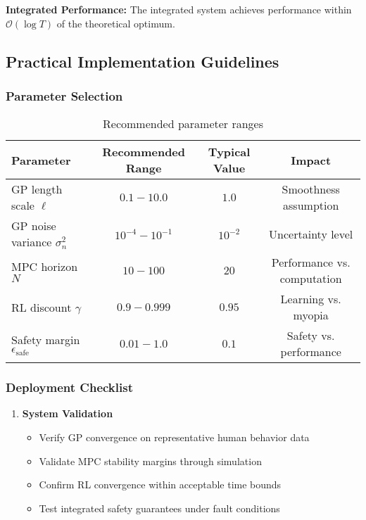 \begin{theorem}
\begin{corollary}
\begin{corollary}
\begin{corollary}
\begin{corollary}
\begin{table}[h]
\begin{theorem}
\textbf{Integrated Performance:}
The integrated system achieves performance within $\mathcal{O}(\log T)$ of the theoretical optimum.
\end{theorem}

\subsection{Practical Implementation Guidelines}

\subsubsection{Parameter Selection}

\begin{table}[h]
\centering
\begin{tabular}{lccc}
\toprule
\textbf{Parameter} & \textbf{Recommended Range} & \textbf{Typical Value} & \textbf{Impact} \\
\midrule
GP length scale $\ell$ & $0.1 - 10.0$ & $1.0$ & Smoothness assumption \\
GP noise variance $\sigma_n^2$ & $10^{-4} - 10^{-1}$ & $10^{-2}$ & Uncertainty level \\
MPC horizon $N$ & $10 - 100$ & $20$ & Performance vs. computation \\
RL discount $\gamma$ & $0.9 - 0.999$ & $0.95$ & Learning vs. myopia \\
Safety margin $\epsilon_{\text{safe}}$ & $0.01 - 1.0$ & $0.1$ & Safety vs. performance \\
\bottomrule
\end{tabular}
\caption{Recommended parameter ranges}
\label{tab:parameter_recommendations}
\end{table}

\subsubsection{Deployment Checklist}

\begin{enumerate}
\item \textbf{System Validation}
   \begin{itemize}
       \item Verify GP convergence on representative human behavior data
       \item Validate MPC stability margins through simulation
       \item Confirm RL convergence within acceptable time bounds
       \item Test integrated safety guarantees under fault conditions
   \end{itemize}


\end{enumerate}
\end{table}
\end{corollary}
\end{corollary}
\end{corollary}
\end{corollary}
\end{theorem}
